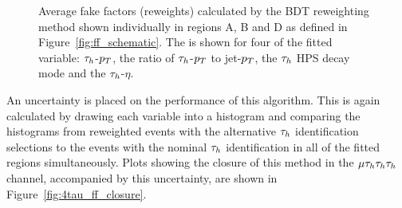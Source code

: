\begin{figure}[!hbtp]
\caption[Plots of the average fake factors calculated.]{Average fake factors (reweights) calculated by the BDT reweighting method shown individually in regions A, B and D as defined in Figure~\ref{fig:ff_schematic}. The is shown for four of the fitted variable: $\tau_{h}$-$p_{T}$, the ratio of $\tau_{h}$-$p_{T}$ to jet-$p_{T}$, the $\tau_{h}$ HPS decay mode and the $\tau_{h}$-$\eta$.}
\label{fig:4tau_ff_reweights}
\end{figure}

An uncertainty is placed on the performance of this algorithm.
This is again calculated by drawing each variable into a histogram and comparing the histograms from reweighted events with the alternative $\tau_{h}$ identification selections to the events with the nominal $\tau_{h}$ identification in all of the fitted regions simultaneously.
Plots showing the closure of this method in the $\mu\tau_{h}\tau_{h}\tau_{h}$ channel, accompanied by this uncertainty, are shown in Figure~\ref{fig:4tau_ff_closure}. \\

